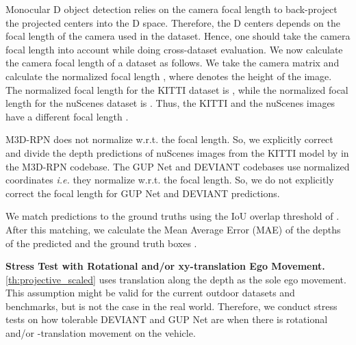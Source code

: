 \documentclass[runningheads]{llncs}
\newcommand{\threeD}{D}
\newcommand{\iou}{IoU}
\newcommand{\iouTwoD}{\iou}
\newcommand{\kitti}{KITTI}
\newcommand{\nuscenes}{nuScenes}
\newcommand{\mthreeDRPN}{M3D-RPN}
\newcommand{\gupNet}{GUP Net}
\newcommand{\thatIs}{\textit{i.e.}}
\newcommand{\noIndentHeading}[1]{\noindent\textbf{#1}}
\newcommand{\methodName}{DEVIANT}
\begin{document}
            Monocular \threeD{} object detection relies on the camera focal length to back-project the projected centers into the \threeD{} space. 
            Therefore, the \threeD{} centers depends on the focal length of the camera used in the dataset. 
            Hence, one should take the camera focal length into account while doing cross-dataset evaluation. 
            We now calculate the camera focal length of a dataset as follows. 
            We take the camera matrix  and calculate the normalized focal length , where  denotes the height of the image. 
            The normalized focal length  for the \kitti{} dataset is , while the normalized focal length  for the \nuscenes{} dataset is .
            Thus, the \kitti{} and the \nuscenes{} images have a different focal length \cite{wang2020train}.
            
            \mthreeDRPN \cite{brazil2019m3d} does not normalize w.r.t. the focal length. 
            So, we explicitly correct and divide the depth predictions of \nuscenes{} images from the \kitti{} model by  in the  \mthreeDRPN \cite{brazil2019m3d} codebase.
            The \gupNet{} \cite{lu2021geometry} and \methodName{} codebases use normalized coordinates \thatIs{} they normalize w.r.t. the focal length. 
            So, we do not explicitly correct the focal length for \gupNet{} and \methodName{} predictions.
            
            We match predictions to the ground truths using the \iouTwoD{} overlap threshold of  \cite{shi2021geometry}. 
            After this matching, we calculate the Mean Average Error (MAE) of the depths of the predicted and the ground truth boxes \cite{shi2021geometry}.

\noIndentHeading{Stress Test with Rotational and/or xy-translation Ego Movement.} 
            \cref{th:projective_scaled} uses translation along the depth as the sole ego movement. 
            This assumption might be valid for the current outdoor datasets and benchmarks, but is not the case in the real world. 
            Therefore, we conduct stress tests on how tolerable \methodName{} and \gupNet{} \cite{lu2021geometry} are when there is rotational and/or -translation movement on the vehicle.
    
\end{document}
